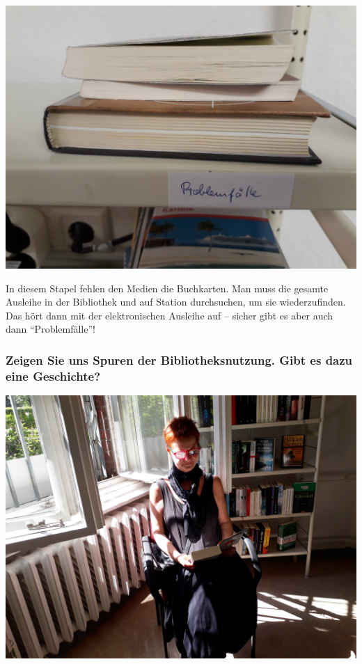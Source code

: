 \begin{center}
\includegraphics{patientenbibliothek/img/Problemfaelle.jpg}
\end{center}

In diesem Stapel fehlen den Medien die Buchkarten. Man muss die gesamte
Ausleihe in der Bibliothek und auf Station durchsuchen, um sie
wiederzufinden. Das hört dann mit der elektronischen Ausleihe auf --
sicher gibt es aber auch dann \enquote{Problemfälle}!

\hypertarget{zeigen-sie-uns-spuren-der-bibliotheksnutzung.-gibt-es-dazu-eine-geschichte}{%
\subsubsection*{Zeigen Sie uns Spuren der Bibliotheksnutzung. Gibt es dazu eine
Geschichte?}\label{zeigen-sie-uns-spuren-der-bibliotheksnutzung.-gibt-es-dazu-eine-geschichte}}

\begin{center}
\includegraphics{patientenbibliothek/img/Patientin.jpg}
\end{center}

